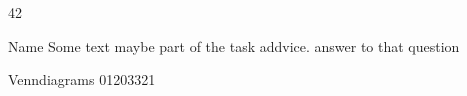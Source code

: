\documentclass{article}
\begin{document}
    \begin{ukon-infie}[1/April/1960]{42}
		\begin{exercise}[p=1,z=1]{Name}
			Some text maybe part of the task addvice.
		    {
		    	answer to that question
		    }
		\end{exercise}
        
        \begin{exercise}[p=10,bubble]{Venndiagrams}
        	{
        	}
	       	{
	       	{01203321}
	       	}
        \end{exercise}

    \end{ukon-infie}
\end{document}
